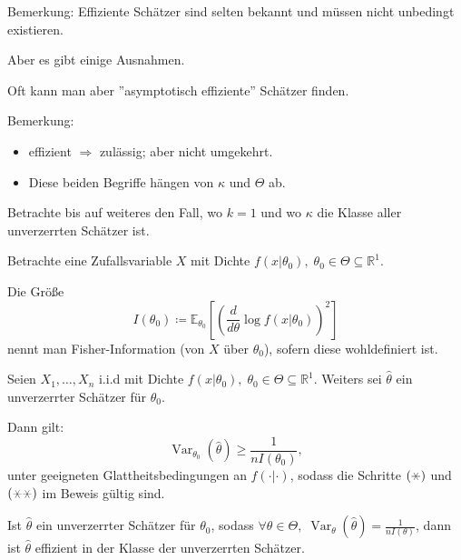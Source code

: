 \documentclass{tstextbook}
\DeclareMathOperator{\Var}{Var}
\newcommand{\E}{\mathbb E}
\newcommand{\R}{\mathbb R}
\begin{document}
\begin{remark}
	Bemerkung: Effiziente Schätzer sind selten bekannt und müssen nicht unbedingt existieren.
	
	Aber es gibt einige Ausnahmen.
	
	Oft kann man aber ''asymptotisch effiziente'' Schätzer finden.
\end{remark}

\begin{remark}
	Bemerkung:
	\begin{itemize}
		\item effizient $ \Rightarrow $ zulässig; aber nicht umgekehrt.
		\item Diese beiden Begriffe hängen von $\kappa$ und $\Theta$ ab.
	\end{itemize}
\end{remark}

Betrachte bis auf weiteres den Fall, wo $ k=1 $ und wo $\kappa$ die Klasse aller unverzerrten Schätzer ist.

\begin{definition}
	Betrachte eine Zufallsvariable $ X $ mit Dichte $ f(x|\theta_0), \; \theta_0\in\Theta\subseteq\R^1 $.
	
	Die Größe 
	\[
	I(\theta_0) \coloneqq \E_{\theta_{0}} \left[\left(\frac{d}{d\theta}\log f(x|\theta_0)\right)^2\right]	
	\] nennt man Fisher-Information  (von $ X $ über $ \theta_0 $), sofern diese wohldefiniert ist.
\end{definition}

\begin{satz} 
	Seien $ X_1,\ldots,X_n $ i.i.d mit Dichte $ f(x|\theta_0), \; \theta_0\in\Theta\subseteq\R^1 $. Weiters sei $ \hat{\theta} $ ein unverzerrter Schätzer für $ \theta_0 $. 
	
	Dann gilt: \[
	\Var_{\theta_0} (\hat{\theta}) \ge \frac{1}{nI(\theta_0)},
	\] 
	unter geeigneten Glattheitsbedingungen an $ f(\cdot|\cdot) $, sodass die Schritte $ (\hexstar) $ und $ (\hexstar\hexstar) $ im Beweis gültig sind.
\end{satz}

\begin{corollary}
	Ist $ \hat{\theta} $ ein unverzerrter Schätzer für $ \theta_0 $, sodass $ \forall\theta\in\Theta,\; \Var_\theta (\hat{\theta}) = \frac{1}{nI(\theta)} $, dann ist $\hat{\theta}$ effizient in der Klasse der unverzerrten Schätzer.
\end{corollary}
\end{document}
